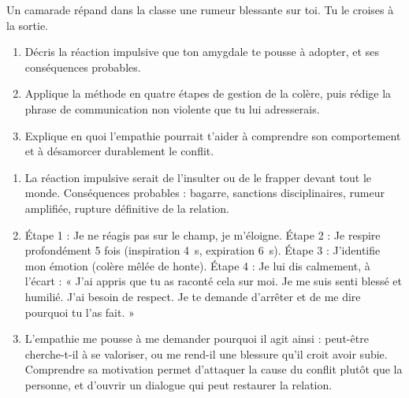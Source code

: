 \documentclass[11pt]{article}
\begin{document}
\begin{exercice}
Un camarade répand dans la classe une rumeur blessante sur toi. Tu le croises à la sortie.
\begin{enumerate}
\item Décris la réaction impulsive que ton amygdale te pousse à adopter, et ses conséquences probables.
\item Applique la méthode en quatre étapes de gestion de la colère, puis rédige la phrase de communication non violente que tu lui adresserais.
\item Explique en quoi l'empathie pourrait t'aider à comprendre son comportement et à désamorcer durablement le conflit.
\end{enumerate}
\end{exercice}

\begin{corrige}[Exercice 1]
\begin{enumerate}
\item La réaction impulsive serait de l'insulter ou de le frapper devant tout le monde. Conséquences probables : bagarre, sanctions disciplinaires, rumeur amplifiée, rupture définitive de la relation.
\item Étape 1 : Je ne réagis pas sur le champ, je m'éloigne. Étape 2 : Je respire profondément 5 fois (inspiration \SI{4}{\second}, expiration \SI{6}{\second}). Étape 3 : J'identifie mon émotion (colère mêlée de honte). Étape 4 : Je lui dis calmement, à l'écart : « J'ai appris que tu as raconté cela sur moi. Je me suis senti blessé et humilié. J'ai besoin de respect. Je te demande d'arrêter et de me dire pourquoi tu l'as fait. »
\item L'empathie me pousse à me demander pourquoi il agit ainsi : peut-être cherche-t-il à se valoriser, ou me rend-il une blessure qu'il croit avoir subie. Comprendre sa motivation permet d'attaquer la cause du conflit plutôt que la personne, et d'ouvrir un dialogue qui peut restaurer la relation.
\end{enumerate}
\end{corrige}
\end{document}
